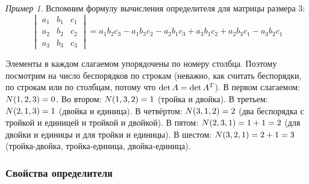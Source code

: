 \documentclass[a4paper,12pt]{article}
\theoremstyle{definition}
\theoremstyle{remark}
\newtheorem*{example}{Пример}
\theoremstyle{remark}
\begin{document}
  \begin{example}
    Вспомним формулу вычисления определителя для матрицы размера $3$:
    \begin{equation*}
      \begin{vmatrix}
        a_1 & b_1 & c_1\\
        a_2 & b_2 & c_2\\
        a_3 & b_3 & c_3
      \end{vmatrix}
        = a_1 b_2 c_3 - a_1 b_3 c_2 - a_2 b_1 c_3 + a_3 b_1 c_2 + a_2 b_3 c_1 - a_3 b_2 c_1
    \end{equation*}
    
    Элементы в каждом слагаемом упорядочены по номеру столбца.
    Поэтому посмотрим на число беспорядков по строкам (неважно, как считать беспорядки, по строкам или по столбцам, потому что $\det A \hm= \det A^T$).
    В первом слагаемом: $N(1, 2, 3) \hm= 0$.
    Во втором: $N(1, 3, 2) \hm= 1$ (тройка и двойка).
    В третьем: $N(2, 1, 3) \hm= 1$ (двойка и единица).
    В четвёртом: $N(3, 1, 2) \hm= 2$ (два беспорядка с тройкой и единицей и тройкой и двойкой).
    В пятом: $N(2, 3, 1) \hm= 1 \hm+ 1 \hm= 2$ (для двойки и единицы и для тройки и единицы).
    В шестом: $N(3, 2, 1) \hm= 2 \hm+ 1 \hm= 3$ (тройка-двойка, тройка-единица, двойка-единица).
  \end{example}
  
  
  \subsubsection{Свойства определителя}
  
\end{document}
